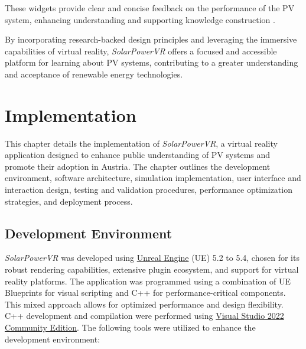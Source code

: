 \documentclass[draft, final]{vutinfth} %
\begin{document}
These widgets provide clear and concise feedback on the performance of the PV system, enhancing understanding and supporting knowledge construction \cite{Merchant2014VrEffectiveness, Mikropoulos2011VrEducational, Sung2015Effects}.

By incorporating research-backed design principles and leveraging the immersive capabilities of virtual reality, \textit{SolarPowerVR} offers a focused and accessible platform for learning about PV systems, contributing to a greater understanding and acceptance of renewable energy technologies.

\chapter{Implementation}

This chapter details the implementation of \textit{SolarPowerVR}, a virtual reality application designed to enhance public understanding of PV systems and promote their adoption in Austria. The chapter outlines the development environment, software architecture, simulation implementation, user interface and interaction design, testing and validation procedures, performance optimization strategies, and deployment process.

\section{Development Environment}


\textit{SolarPowerVR} was developed using \href{https://www.unrealengine.com/de}{Unreal Engine} (UE) 5.2 to 5.4, chosen for its robust rendering capabilities, extensive plugin ecosystem, and support for virtual reality platforms. The application was programmed using a combination of UE Blueprints for visual scripting and C++ for performance-critical components. This mixed approach allows for optimized performance and design flexibility. C++ development and compilation were performed using \href{https://visualstudio.microsoft.com/de/vs/community/}{Visual Studio 2022 Community Edition}. The following tools were utilized to enhance the development environment:
\end{document}
